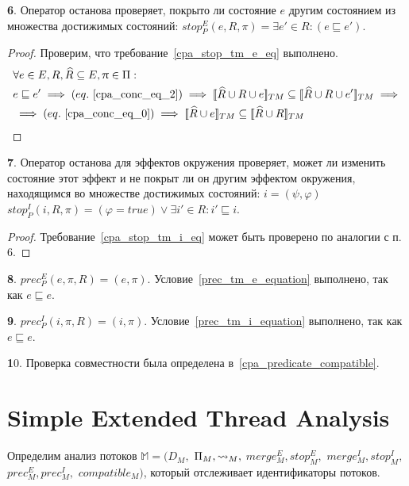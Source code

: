{\textbf 6.} Оператор останова проверяет, покрыто ли состояние $e$ другим состоянием из множества достижимых состояний: $stop^E_{P}(e, R, \pi) = \exists e'\in R: (e \sqsubseteq e')$.

\begin{proof}
Проверим, что требование~\ref{cpa_stop_tm_e_eq} выполнено.
\begin{align}
&\forall e \in E, R, \widehat{R} \subseteq E, \pi \in \Pi: \nonumber \\
& e \sqsubseteq e' \implies (eq.~\ref{cpa_conc_eq_2}) \implies \conctm{\widehat{R} \cup R \cup e} \subseteq \conctm{\widehat{R} \cup R \cup e'} \implies \nonumber \\
& \implies (eq.~\ref{cpa_conc_eq_0}) \implies \conctm{\widehat{R} \cup e} \subseteq \conctm{\widehat{R} \cup R} \nonumber
\end{align}
\end{proof}

{\textbf 7.} Оператор останова для эффектов окружения проверяет, может ли изменить состояние этот эффект и не покрыт ли он другим эффектом окружения, находящимся во множестве достижимых состояний:  $i=(\psi,\varphi)$
$stop^I_{P}(i, R, \pi) = (\varphi=true) \lor \exists i'\in R: i' \sqsubseteq i$.

\begin{proof}
Требование~\ref{cpa_stop_tm_i_eq} может быть проверено по аналогии с п. 6. 
\end{proof}

{\textbf 8.} $prec^E_{P}(e, \pi, R) = (e, \pi)$. Условие~\ref{prec_tm_e_equation} выполнено, так как $e \sqsubseteq e$.

{\textbf 9.} $prec^I_{P}(i, \pi, R) = (i, \pi)$. Условие~\ref{prec_tm_i_equation} выполнено, так как $e \sqsubseteq e$.

{\textbf 10.} Проверка совместности была определена в~\ref{cpa_predicate_compatible}.

\section{Simple Extended Thread Analysis}
\label{sect_simple_extended_thread_analysis}

Определим анализ потоков
$\mathbb{M}=(D_{M},$ $\Pi_{M}, \leadsto_{M},$ $merge^E_{M}, stop^E_{M},$ $merge^I_{M}, stop^I_{M},$ $prec^E_{M},prec^I_{M},$ $compatible_{M})$, который отслеживает идентификаторы потоков.


